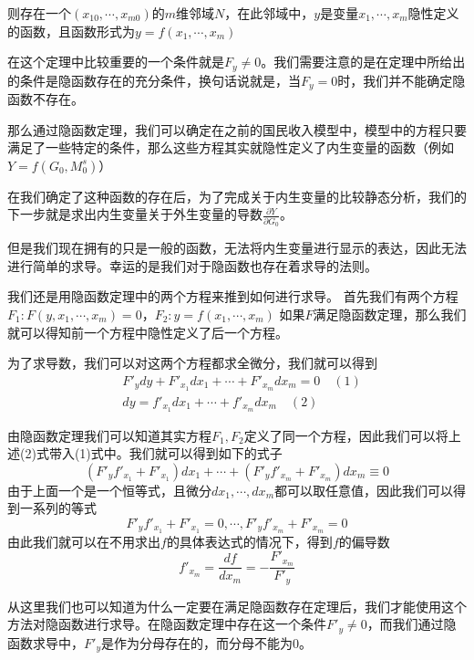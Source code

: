 \documentclass[UTF8,12pt]{ctexart}
\numberwithin{equation}{section} %
\numberwithin{figure}{section}
\numberwithin{table}{section}
\begin{document}
	则存在一个$(x_{10},\cdots,x_{m0})$的$m$维邻域$N$，在此邻域中，$y$是变量$x_1,\cdots,x_m$隐性定义的函数，且函数形式为$y = f(x_1,\cdots,x_m)$
	
	在这个定理中比较重要的一个条件就是$F_y \neq 0$。我们需要注意的是在定理中所给出的条件是隐函数存在的充分条件，换句话说就是，当$F_y = 0$时，我们并不能确定隐函数不存在。
	
	那么通过隐函数定理，我们可以确定在之前的国民收入模型中，模型中的方程只要满足了一些特定的条件，那么这些方程其实就隐性定义了内生变量的函数（例如$Y = f(G_0,M^s_0)$）
	
	在我们确定了这种函数的存在后，为了完成关于内生变量的比较静态分析，我们的下一步就是求出内生变量关于外生变量的导数$\frac{\partial Y}{\partial G_0}$。
	
	但是我们现在拥有的只是一般的函数，无法将内生变量进行显示的表达，因此无法进行简单的求导。幸运的是我们对于隐函数也存在着求导的法则。
	
	我们还是用隐函数定理中的两个方程来推到如何进行求导。
	首先我们有两个方程$F_1:F(y,x_1,\cdots,x_m) = 0$，$F_2:y = f(x_1,\cdots,x_m)$
	如果$F$满足隐函数定理，那么我们就可以得知前一个方程中隐性定义了后一个方程。
	
	为了求导数，我们可以对这两个方程都求全微分，我们就可以得到
	\begin{equation}
		\begin{aligned}
			&F'_ydy + F'_{x_1}dx_1 + \cdots + F'_{x_m}dx_m = 0 \quad (1) \\
			&dy = f'_{x_1}dx_1 + \cdots + f'_{x_m}dx_m \quad (2)
		\end{aligned}
	\end{equation}
	
	由隐函数定理我们可以知道其实方程$F_1,F_2$定义了同一个方程，因此我们可以将上述(2)式带入(1)式中。我们就可以得到如下的式子
	\begin{equation}
		(F'_yf'_{x_1} + F'_{x_1})dx_1 + \cdots + (F'_yf'_{x_m} + F'_{x_m})dx_m \equiv 0
	\end{equation}
	由于上面一个是一个恒等式，且微分$dx_1,\cdots,dx_m$都可以取任意值，因此我们可以得到一系列的等式
	\begin{equation}
		F'_yf'_{x_1} + F'_{x_1} = 0,\cdots,F'_yf'_{x_m} + F'_{x_m} = 0
	\end{equation}
	由此我们就可以在不用求出$f$的具体表达式的情况下，得到$f$的偏导数
	\begin{equation}
		f'_{x_m} = \frac{df}{dx_m}= - \frac{F'_{x_m}}{F'_y}
	\end{equation}
	
	从这里我们也可以知道为什么一定要在满足隐函数存在定理后，我们才能使用这个方法对隐函数进行求导。在隐函数定理中存在这一个条件$F'_y \neq 0$，而我们通过隐函数求导中，$F'_y$是作为分母存在的，而分母不能为0。
	
\end{document}
